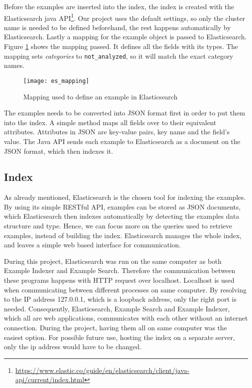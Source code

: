 Before the examples are inserted into the index, the index is created with the Elasticsearch java API\footnote{\url{https://www.elastic.co/guide/en/elasticsearch/client/java-api/current/index.html}}. Our project uses the default settings, so only the cluster name is needed to be defined beforehand, the rest happens automatically by Elasticsearch. Lastly a mapping for the example object is passed to Elasticsearch. Figure \ref{fig:es_mapping} shows the mapping passed. It defines all the fields with its types. The mapping sets \textit{categories} to \texttt{not\_analyzed}, so it will match the exact category names.

\begin{figure}[H] 
\caption{Mapping used to define an example in Elasticsearch}
\centering
\texttt{[image: es\_mapping]}
\label{fig:es_mapping}
\end{figure}

The examples needs to be converted into JSON  format first in order to put them into the index. A simple method maps all fields over to their equivalent attributes. Attributes in JSON are key-value pairs, key name and the field's value. The Java API sends each example to Elasticsearch as a document on the JSON format, which then indexes it.

\subsection{Index}
As already mentioned, Elasticsearch is the chosen tool for indexing the examples. By using its simple RESTful API, examples can be stored as JSON documents, which Elasticsearch then indexes automatically by detecting the examples data structure and type. Hence, we can focus more on the queries used to retrieve examples, instead of building the index. Elasticsearch manages the whole index, and leaves a simple web based interface for communication.

During this project, Elasticsearch was run on the same computer as both Example Indexer and Example Search. Therefore the communication between these programs happens with HTTP request over localhost. Localhost is used when communicating between different processes on same computer. By resolving to the IP address 127.0.0.1, which is a loopback address, only the right port is needed. Consequently, Elasticsearch, Example Search and Example Indexer, which all are web applications, communicates with each other without an internet connection. During the project, having them all on same computer was the easiest option. For possible future use, hosting the index on a separate server, only the ip address would have to be changed.

